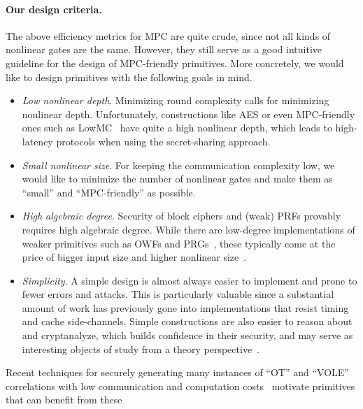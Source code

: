 \paragraph{Our design criteria.}  The above efficiency metrics for MPC are quite crude, since not all kinds of nonlinear gates are the same. However, they still serve as a good intuitive guideline for the design of MPC-friendly primitives. More concretely, we would like to design primitives with the following goals in mind.

\begin{itemize}
    \item \textit{Low nonlinear depth}. Minimizing round complexity calls for minimizing nonlinear depth. Unfortunately, constructions like AES or even MPC-friendly ones such as LowMC~\cite{albrecht2015-lowmc}
    have quite a high nonlinear depth, which leads to high-latency protocols when using the secret-sharing approach.

\item \textit{Small nonlinear size}.
 For keeping the communication complexity low, we would like to minimize the number of nonlinear gates and make them as ``small'' and ``MPC-friendly'' as possible.

\item \textit{High algebraic degree}.
Security of block ciphers and (weak) PRFs provably requires high algebraic degree. While there are low-degree implementations of weaker primitives such as OWFs and PRGs~\cite{MQref,Goldreich,ApplebaumIK04}, these typically come at the price of bigger input size and higher nonlinear size~\cite{couteau2018-goldreich-prg,yang2021revisiting}.

    \item \textit{Simplicity}.  A simple design is almost always easier to implement and prone to fewer errors and attacks. This is particularly valuable since a substantial amount of work has previously gone into implementations that resist timing and cache side-channels. Simple constructions are also easier to reason about and cryptanalyze, which builds confidence in their security, and may serve as interesting objects of study from a theory perspective~\cite{Goldreich,MilesV15,AkaviaBGKR14}.
\end{itemize}

\iffalse
    Recent techniques for securely generating many instances of ``OT'' and ``VOLE'' correlations  with low communication and computation costs~\cite{BCGI18,BCGKIS19,more} motivate primitives that can benefit from these


